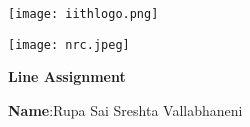 \documentclass[10pt,a4paper]{report}
\begin{document}
\begin{figure*}[!tbp]
  \centering
  \begin{minipage}[b]{0.4\textwidth}
   \texttt{[image: iithlogo.png]} 
  \end{minipage}
  \hfill
  \vspace{5mm}\begin{minipage}[b]{0.4\textwidth}
\raggedleft \texttt{[image: nrc.jpeg]} 
  \end{minipage}\vspace{0.2cm}
\end{figure*}
\raggedright 
\begin{center}
\Large \textbf{Line Assignment}\hspace{2.5cm} %
\end{center}
\begin{center}
\hspace{0.5cm}
\textbf{Name}:\hspace{2mm}Rupa Sai Sreshta Vallabhaneni\hspace{1cm}
\date{25-September-2022}

\end{center}
\end{document}

